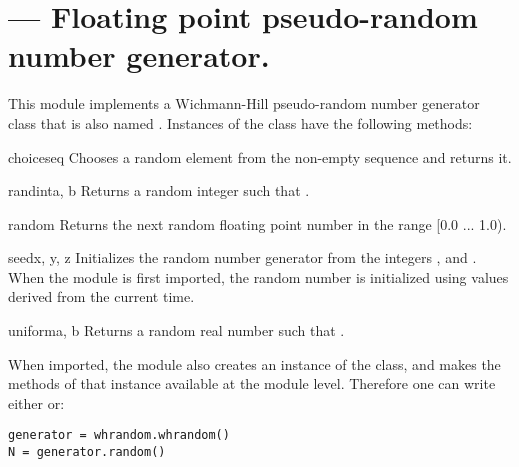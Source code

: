 \section{ ---
         Floating point pseudo-random number generator.}



This module implements a Wichmann-Hill pseudo-random number generator
class that is also named .  Instances of the
 class have the following methods:

\begin{funcdesc}{choice}{seq}
Chooses a random element from the non-empty sequence  and returns it.
\end{funcdesc}

\begin{funcdesc}{randint}{a, b}
Returns a random integer  such that .
\end{funcdesc}

\begin{funcdesc}{random}{}
Returns the next random floating point number in the range [0.0 ... 1.0).
\end{funcdesc}

\begin{funcdesc}{seed}{x, y, z}
Initializes the random number generator from the integers
,
and
.
When the module is first imported, the random number is initialized
using values derived from the current time.
\end{funcdesc}

\begin{funcdesc}{uniform}{a, b}
Returns a random real number  such that .
\end{funcdesc}

When imported, the  module also creates an instance of
the  class, and makes the methods of that instance
available at the module level.  Therefore one can write either 
 or:
\begin{verbatim}
generator = whrandom.whrandom()
N = generator.random()
\end{verbatim}
%
\begin{seealso}
\end{seealso}
